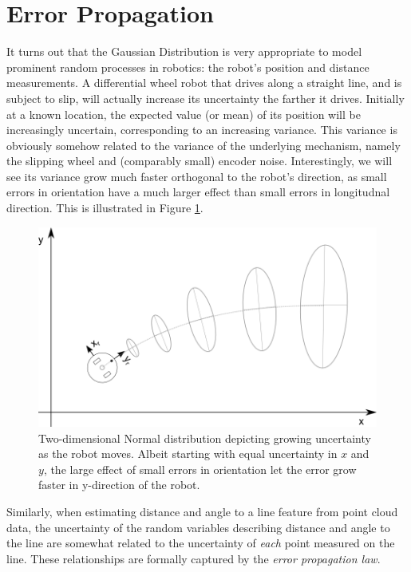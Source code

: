 \section{Error Propagation}\label{sec:errorprop}
It turns out that the Gaussian Distribution is very appropriate to model prominent random processes in robotics: the robot's position and distance measurements. A differential wheel robot that drives along a straight line, and is subject to slip, will actually increase its uncertainty the farther it drives. Initially at a known location, the expected value (or mean) of its position will be increasingly uncertain, corresponding to an increasing variance. This variance is obviously somehow related to the variance of the underlying mechanism, namely the slipping wheel and (comparably small) encoder noise. Interestingly, we will see its variance grow much faster orthogonal to the robot's direction, as small errors in orientation have a much larger effect than small errors in longitudnal direction. This is illustrated in Figure \ref{fig:errorprop_odometry}. 

\begin{figure}
	\centering
		\includegraphics[width=\textwidth]{figs/errorprop_odometry}
	\caption{Two-dimensional Normal distribution depicting growing uncertainty as the robot moves. Albeit starting with equal uncertainty in $x$ and $y$, the large effect of small errors in orientation let the error grow faster in y-direction of the robot.}
	\label{fig:errorprop_odometry}
\end{figure}

Similarly, when estimating distance and angle to a line feature from point cloud data, the uncertainty of the random variables describing distance and angle to the line are somewhat related to the uncertainty of \emph{each} point measured on the line. These relationships are formally captured by the \emph{error propagation law}.


